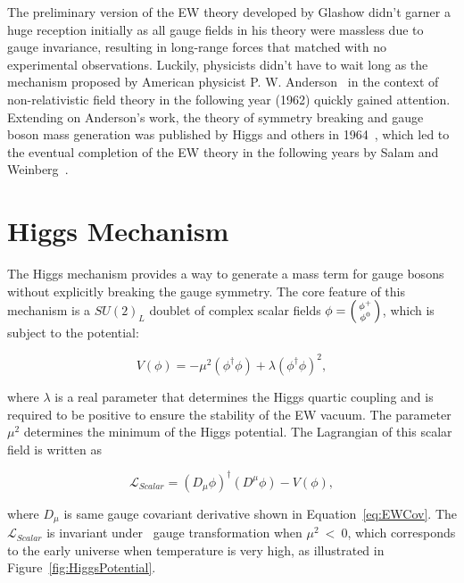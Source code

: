 The preliminary version of the \ac{EW} theory developed by Glashow didn't garner a huge reception initially as all gauge fields in his theory were massless due to gauge invariance, resulting in long-range forces that matched with no experimental observations. Luckily, physicists didn't have to wait long as the mechanism proposed by American physicist P. W. Anderson~\cite{Anderson:1963pc} in the context of non-relativistic field theory in the following year (1962) quickly gained attention. Extending on Anderson's work, the theory of symmetry breaking and gauge boson mass generation was published by Higgs and others in 1964~\cite{PhysRevLett.13.321,PhysRevLett.13.508,PhysRevLett.13.585}, which led to the eventual completion of the \ac{EW} theory in the following years by Salam and Weinberg~\cite{Salam:1964ry,Weinberg:1967tq}.

\section{Higgs Mechanism}
\label{sec:Higgs}

The Higgs mechanism provides a way to generate a mass term for gauge bosons without explicitly breaking the gauge symmetry. The core feature of this mechanism is a $SU(2)_{L}$ doublet of complex scalar fields $\phi=\begin{psmallmatrix}\phi^{+}\\\phi^{0}\end{psmallmatrix}$, which is subject to the potential:

\begin{equation}
V(\phi)=-\mu^2(\phi^{\dagger}\phi)+\lambda(\phi^{\dagger}\phi)^2,
\end{equation}

where $\lambda$ is a real parameter that determines the Higgs quartic coupling and is required to be positive to ensure the stability of the \ac{EW} vacuum. The parameter $\mu^2$ determines the minimum of the Higgs potential. The Lagrangian of this scalar field is written as 

\begin{equation}
\mathcal{L}_{Scalar}=(D_{\mu}\phi)^{\dagger}(D^{\mu}\phi)-V(\phi),
\end{equation}

where $D_{\mu}$ is same gauge covariant derivative shown in Equation~\ref{eq:EWCov}. The $\mathcal{L}_{Scalar}$ is invariant under \ew~gauge transformation when $\mu^2~<~0$, which corresponds to the early universe when temperature is very high, as illustrated in Figure~\ref{fig:HiggsPotential}.

